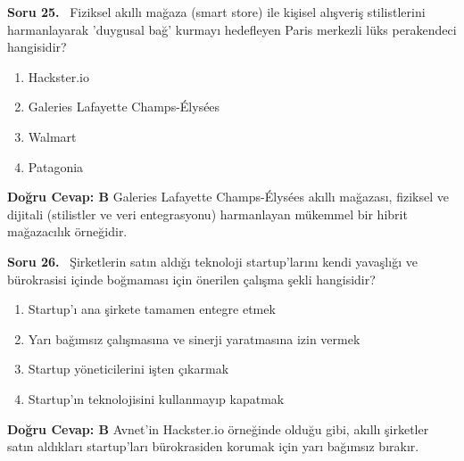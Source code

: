 \documentclass[11pt,a4paper,openany]{book}
\begin{document}
\needspace{5cm}
\vspace{8pt}
\noindent\textbf{\large\sffamily Soru 25.} \ Fiziksel akıllı mağaza (smart store) ile kişisel alışveriş stilistlerini harmanlayarak 'duygusal bağ' kurmayı hedefleyen Paris merkezli lüks perakendeci hangisidir?
\begin{enumerate}[label=\Alph*), leftmargin=25pt, topsep=4pt, itemsep=2pt]
    \item Hackster.io
    \item Galeries Lafayette Champs-Élysées
    \item Walmart
    \item Patagonia
\end{enumerate}
\vspace{4pt}
\begin{tcolorbox}[title=Cevap ve Açıklama, colback=gray!3!white, colframe=primarycolor!90!black, arc=2mm, fonttitle=\bfseries\sffamily, top=6pt, bottom=6pt]
    \textbf{Doğru Cevap: B}
    \vspace{2pt}
    Galeries Lafayette Champs-Élysées akıllı mağazası, fiziksel ve dijitali (stilistler ve veri entegrasyonu) harmanlayan mükemmel bir hibrit mağazacılık örneğidir.
\end{tcolorbox}
\vspace{10pt}

\needspace{5cm}
\vspace{8pt}
\noindent\textbf{\large\sffamily Soru 26.} \ Şirketlerin satın aldığı teknoloji startup'larını kendi yavaşlığı ve bürokrasisi içinde boğmaması için önerilen çalışma şekli hangisidir?
\begin{enumerate}[label=\Alph*), leftmargin=25pt, topsep=4pt, itemsep=2pt]
    \item Startup'ı ana şirkete tamamen entegre etmek
    \item Yarı bağımsız çalışmasına ve sinerji yaratmasına izin vermek
    \item Startup yöneticilerini işten çıkarmak
    \item Startup'ın teknolojisini kullanmayıp kapatmak
\end{enumerate}
\vspace{4pt}
\begin{tcolorbox}[title=Cevap ve Açıklama, colback=gray!3!white, colframe=primarycolor!90!black, arc=2mm, fonttitle=\bfseries\sffamily, top=6pt, bottom=6pt]
    \textbf{Doğru Cevap: B}
    \vspace{2pt}
    Avnet'in Hackster.io örneğinde olduğu gibi, akıllı şirketler satın aldıkları startup'ları bürokrasiden korumak için yarı bağımsız bırakır.
\end{tcolorbox}
\vspace{10pt}
\end{document}
